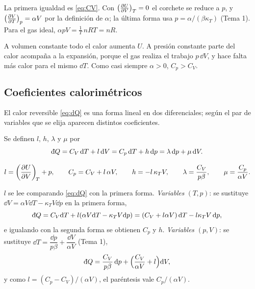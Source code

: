 \begin{demostracion}
La primera igualdad es \eqref{eq:CV}. Con $\bigl(\tfrac{\partial U}{\partial V}\bigr)_{T}=0$ el corchete se reduce a $p$, y
$\bigl(\tfrac{\partial V}{\partial T}\bigr)_{p}=\alpha V$ por la definición de $\alpha$; la última forma usa $p=\alpha/(\beta\kappa_T)$ (Tema 1).
Para el gas ideal, $\alpha pV=\frac1T\,nRT=nR$.
\end{demostracion}

\begin{observacion}
A volumen constante todo el calor aumenta $U$. A presión constante parte del calor acompaña a la expansión,
porque el gas realiza el trabajo $p\,\dd V$, y hace falta más calor para el mismo $\dd T$. Como casi siempre
$\alpha>0$, $C_p>C_V$.
\end{observacion}

\subsection{Coeficientes calorimétricos}

El calor reversible \eqref{eq:dQ} es una forma lineal en dos diferenciales; según el par de variables que se
elija aparecen distintos coeficientes.

\begin{definicion}
Se definen $l$, $h$, $\lambda$ y $\mu$ por
\begin{equation}\label{eq:calorim}
  \dbar Q=C_V\,\dd T+l\,\dd V=C_p\,\dd T+h\,\dd p=\lambda\,\dd p+\mu\,\dd V .
\end{equation}
\end{definicion}

\begin{proposicion}
\begin{equation}\label{eq:calorimrel}
  l=\left(\frac{\partial U}{\partial V}\right)_{\!T}+p,\qquad C_p=C_V+l\,\alpha V,\qquad h=-l\,\kappa_TV,\qquad
  \lambda=\frac{C_V}{p\beta},\qquad \mu=\frac{C_p}{\alpha V}.
\end{equation}
\end{proposicion}

\begin{demostracion}
$l$ se lee comparando \eqref{eq:dQ} con la primera forma. \emph{Variables $(T,p)$}: se sustituye
$\dd V=\alpha V\dd T-\kappa_TV\dd p$ en la primera forma,
\[
  \dbar Q=C_V\dd T+l(\alpha V\dd T-\kappa_TV\dd p)=(C_V+l\alpha V)\,\dd T-l\kappa_TV\,\dd p,
\]
e igualando con la segunda forma se obtienen $C_p$ y $h$. \emph{Variables $(p,V)$}: se sustituye
$\dd T=\dfrac{\dd p}{p\beta}+\dfrac{\dd V}{\alpha V}$ (Tema 1),
\[
  \dbar Q=\frac{C_V}{p\beta}\,\dd p+\Bigl(\frac{C_V}{\alpha V}+l\Bigr)\dd V,
\]
y como $l=(C_p-C_V)/(\alpha V)$, el paréntesis vale $C_p/(\alpha V)$.
\end{demostracion}

